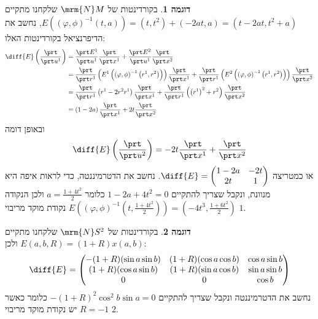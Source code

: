 \documentclass{article}
\theoremstyle{definition}
\newtheorem*{example*}{דוגמה}
\begin{document}
	\begin{example*}
		בקורדינטות של
		\(\mrm{N} M\)
		שלקחנו מתקיים
		\(
			E(\left(\varphi,\phi\right)^{-1}(t,a))
			=(t,t^2)+(-2at,a)
			=(t-2at,t^2+a)
		\),
		נחשב את הדיפרנציאל בקורדינטות האלו:
		\begin{equation*}\begin{split}
			\diff{E}\left(\frac{\prt}{\prt u^1}\right)
			&=\frac{\prt E^1}{\prt u^1} \frac{\prt}{\prt x^1}
			+\frac{\prt E^2}{\prt u^1} \frac{\prt}{\prt x^2}
			\\&=\frac{\prt}{\prt r^1}\left(E^1\left(\left(\varphi,\phi\right)^{-1}\left(r^1,r^2\right)\right)\right) \frac{\prt}{\prt x^1}
			+\frac{\prt}{\prt r^1}\left(E^2\left(\left(\varphi,\phi\right)^{-1}\left(r^1,r^2\right)\right)\right) \frac{\prt}{\prt x^2}
			\\&=\frac{\prt}{\prt r^1}\left(r^1-2r^2 r^1\right) \frac{\prt}{\prt x^1}
			+\frac{\prt}{\prt r^1}\left(\left(r^1\right)^2+r^2\right) \frac{\prt}{\prt x^2}
			\\&=\left(1-2a\right) \frac{\prt}{\prt x^1}
			+2t \frac{\prt}{\prt x^2}
		\end{split}\end{equation*}
		ובאופן דומה
		\[
			\diff{E}\left(\frac{\prt}{\prt u^2}\right)
			=-2t \frac{\prt}{\prt x^1}
			+\frac{\prt}{\prt x^2}
		\]
		או כמטריצה
		\(
			\diff{E}
			=\begin{pmatrix}
				1-2a & -2t
				\\
				2t & 1
			\end{pmatrix}
		\).
		נחשב את הדטרמיננטה, כדי לראות איפה היא מנוונת, ונקבל שצריך להתקיים
		\(1-2a+4t^2=0\)
		כלומר
		\(a=\frac{1+4t^2}{2}\)
		ולכן הנקודה
		\(
			E(\left(\varphi,\phi\right)^{-1}(t,\frac{1+4t^2}{2}))
			=\left(-4t^3,\frac{1+6t^2}{2}\right)
		\)
		נקודת מוקד מריבוי \(1\).
	\end{example*}

	\begin{example*}
		בקורדינטות של
		\(\mrm{N} S^2\)
		שלקחנו מתקיים
		\(
			E(a,b,R) = (1+R)x(a,b)
		\)
		ולכן:
		\[
			\diff{E} = \begin{pmatrix}
				-(1+R)(\sin a \sin b) & (1+R)(\cos a \cos b) & \cos a \sin b
				\\
				(1+R)(\cos a \sin b) & (1+R)(\sin a \cos b) & \sin a \sin b
				\\
				0 & 0 & \cos b
			\end{pmatrix}
		\]
		נחשב את הדטרמיננטה ונקבל שצריך להתקיים
		\(-(1+R)^2 \cos^2 b \sin a=0\)
		כלומר כאשר
		\(R=-1\)
		יש נקודת מוקד מריבוי \(2\).
	\end{example*}
\end{document}
